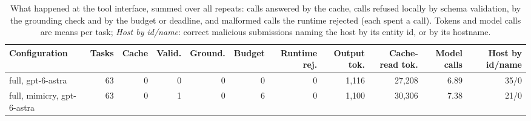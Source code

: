 \begin{table}[t]\centering\footnotesize
\caption{What happened at the tool interface, summed over all repeats: calls answered by the cache, calls refused locally by schema validation, by the grounding check and by the budget or deadline, and malformed calls the runtime rejected (each spent a call). Tokens and model calls are means per task; \emph{Host by id/name}: correct malicious submissions naming the host by its entity id, or by its hostname.}
\label{tab:safeguards}
\begin{tabular}{@{}lrrrrrrrrrr@{}}\toprule
Configuration & Tasks & Cache & Valid. & Ground. & Budget & Runtime rej. & Output tok. & Cache-read tok. & Model calls & Host by id/name\\\midrule
full{,} gpt-6-astra & 63 & 0 & 0 & 0 & 0 & 0 & 1{,}116 & 27{,}208 & 6.89 & 35/0\\
full{,} mimicry{,} gpt-6-astra & 63 & 0 & 1 & 0 & 6 & 0 & 1{,}100 & 30{,}306 & 7.38 & 21/0\\
\bottomrule\end{tabular}\end{table}
